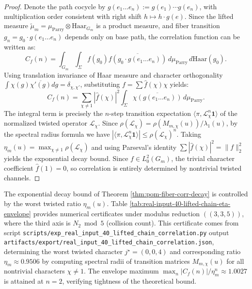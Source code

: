 \begin{proof}
Denote the path cocycle by $g(e_1 \dots e_n) := g(e_1) \cdots g(e_n)$, with multiplication order consistent with right shift $h \mapsto h \cdot g(e)$.
Since the lifted measure $\widetilde\mu_m = \mu_{\mathrm{Parry}} \otimes \mathrm{Haar}_{G_m}$ is a product measure, and fiber transition $g_n = g_0 \cdot g(e_1 \dots e_n)$ depends only on base path, the correlation function can be written as:
\[
C_f(n) = \int_{G_m} \int_{\Sigma} f(g_0) \overline{f(g_0 \cdot g(e_1 \dots e_n))} \, d\mu_{\mathrm{Parry}} \, d\mathrm{Haar}(g_0).
\]
Using translation invariance of Haar measure and character orthogonality $\int \chi(g) \overline{\chi'(g)} dg = \delta_{\chi,\chi'}$, substituting $f = \sum \hat{f}(\chi) \chi$ yields:
\[
C_f(n) = \sum_{\chi \neq 1} |\hat{f}(\chi)|^2 \int_{\Sigma} \overline{\chi(g(e_1 \dots e_n))} \, d\mu_{\mathrm{Parry}}.
\]
The integral term is precisely the $n$-step transition expectation $\langle \pi, \mathcal{L}_\chi^n \mathbf{1} \rangle$ of the normalized twisted operator $\mathcal{L}_\chi$.
Since $\rho(\mathcal{L}_\chi) = \rho(M_{m,\chi}(u))/\lambda_1(u)$, by the spectral radius formula we have $|\langle \pi, \mathcal{L}_\chi^n \mathbf{1} \rangle| \le \rho(\mathcal{L}_\chi)^n$.
Taking $\eta_m(u) = \max_{\chi \neq 1} \rho(\mathcal{L}_\chi)$ and using Parseval's identity $\sum |\hat{f}(\chi)|^2 = \|f\|_2^2$ yields the exponential decay bound.
Since $f \in L^2_0(G_m)$, the trivial character coefficient $\hat{f}(1) = 0$, so correlation is entirely determined by nontrivial twisted channels.
\end{proof}

\begin{remark}\label{rem:pom-fiber-corr-decay-certificate}
The exponential decay bound of Theorem \ref{thm:pom-fiber-corr-decay} is controlled by the worst twisted ratio $\eta_m(u)$. Table \ref{tab:real-input-40-lifted-chain-eta-envelope} provides numerical certificates under modulus reduction $((3,3,5))$, where the third axis is $N_2 \bmod 5$ (collision count). This certificate comes from script \verb|scripts/exp_real_input_40_lifted_chain_correlation.py| output \verb|artifacts/export/real_input_40_lifted_chain_correlation.json|, determining the worst twisted character $j^\star=(0,0,4)$ and corresponding ratio $\eta_m \approx 0.9506$ by computing spectral radii of transition matrices $M_{m,\chi}(u)$ for all nontrivial characters $\chi \neq 1$. The envelope maximum $\max_n |C_f(n)|/\eta_m^n \approx 1.0027$ is attained at $n=2$, verifying tightness of the theoretical bound.


\end{remark}


